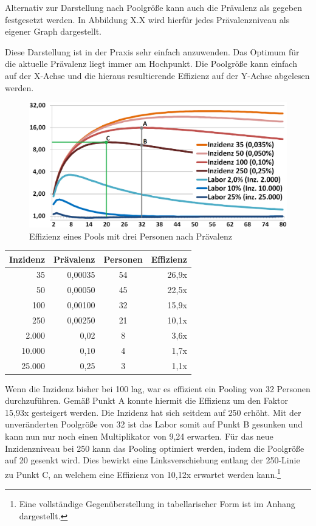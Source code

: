 \cleardoublepage

Alternativ zur Darstellung nach Poolgröße kann auch die Prävalenz als gegeben festgesetzt werden.
In Abbildung X.X wird hierfür jedes Prävalenzniveau als eigener Graph dargestellt.

Diese Darstellung ist in der Praxis sehr einfach anzuwenden.
Das Optimum für die aktuelle Prävalenz liegt immer am Hochpunkt.
Die Poolgröße kann einfach auf der X-Achse und die hieraus resultierende Effizienz auf der Y-Achse abgelesen werden.
\begin{figure}[h]
	\centering
	\includegraphics[width=1\textwidth]{img/EffizienzTestgruppePfeile}
	\caption{Effizienz eines Pools mit drei Personen nach Prävalenz}
\end{figure}

\begin{table}
	\begin{tabular}{|r|r|c|r|}
		\hline
		Inzidenz&Prävalenz&Personen&Effizienz\\
		\hline
		35 & 0,00035 & 54 & 26,9x\\
		\hline
		50 & 0,00050 & 45 & 22,5x \\
		\hline
		100 & 0,00100 & 32 & 15,9x \\
		\hline
		250 & 0,00250 & 21 & 10,1x \\
		\hline
		2.000 & 0,02 & 8 & 3,6x\\
		\hline
		10.000 & 0,10  & 4 & 1,7x\\
		\hline
		25.000 & 0,25 & 3 & 1,1x\\
		\hline
	\end{tabular}
\end{table} 
Wenn die Inzidenz bisher bei 100 lag, war es effizient ein Pooling von 32 Personen durchzuführen.
Gemäß Punkt A konnte hiermit die Effizienz um den Faktor 15,93x gesteigert werden.
Die Inzidenz hat sich seitdem auf 250 erhöht.
Mit der unveränderten Poolgröße von 32 ist das Labor somit auf Punkt B gesunken und kann nun nur noch einen Multiplikator von 9,24 erwarten.
Für das neue Inzidenzniveau bei 250 kann das Pooling optimiert werden, indem die Poolgröße auf 20 gesenkt wird.
Dies bewirkt eine Linksverschiebung entlang der 250-Linie zu Punkt C, an welchem eine Effizienz von 10,12x erwartet werden kann.\footnote{Eine vollständige Gegenüberstellung in tabellarischer Form ist im Anhang dargestellt.}

